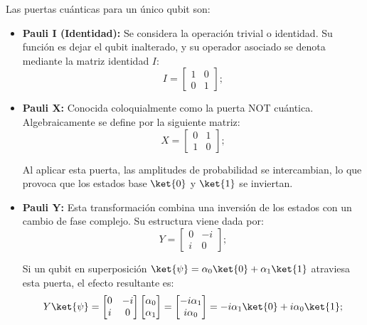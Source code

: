 Las puertas cuánticas para un único qubit son:

\begin{itemize}
    \item \textbf{Pauli I (Identidad):} Se considera la operación trivial o identidad. Su función es dejar el qubit inalterado, y su operador asociado se denota mediante la matriz identidad $I$:
          \[
              I = \begin{bmatrix}
                  1 & 0 \\
                  0 & 1
              \end{bmatrix};
          \]

    \item \textbf{Pauli X:} Conocida coloquialmente como la puerta NOT cuántica. Algebraicamente se define por la siguiente matriz:
          \[
              X = \begin{bmatrix}
                  0 & 1 \\
                  1 & 0
              \end{bmatrix};
          \]

          Al aplicar esta puerta, las amplitudes de probabilidad se intercambian, lo que provoca que los estados base $\ket{0}$ y $\ket{1}$ se inviertan.

    \item \textbf{Pauli Y:} Esta transformación combina una inversión de los estados con un cambio de fase complejo. Su estructura viene dada por:
          \[
              Y = \begin{bmatrix}
                  0 & -i \\
                  i & 0
              \end{bmatrix};
          \]

          Si un qubit en superposición $\ket{\psi} = \alpha_0\ket{0} + \alpha_1\ket{1}$ atraviesa esta puerta, el efecto resultante es:
          \[
              Y\ket{\psi} = \begin{bmatrix} 0 & -i \\ i & 0 \end{bmatrix} \begin{bmatrix} \alpha_0 \\ \alpha_1 \end{bmatrix} = \begin{bmatrix} -i\alpha_1 \\ i\alpha_0 \end{bmatrix} = -i\alpha_1\ket{0} + i\alpha_0\ket{1};
          \]


\end{itemize}
